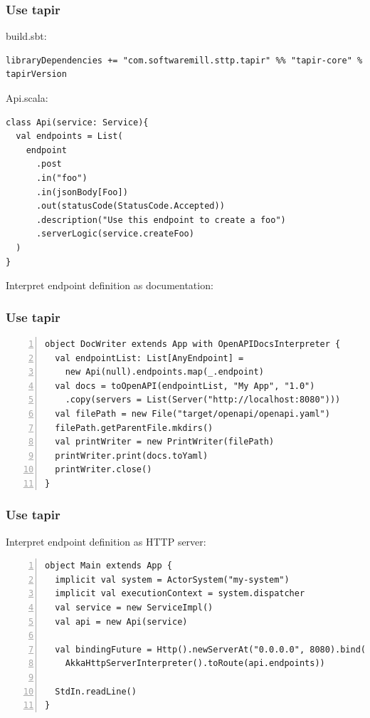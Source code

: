 \documentclass[aspectratio=169]{beamer}
\begin{document}
\begin{frame}[fragile]
  \frametitle{Use tapir}
build.sbt:
\begin{lstlisting}[style=myScalaStyle,frame=none]
libraryDependencies += "com.softwaremill.sttp.tapir" %% "tapir-core" % tapirVersion
\end{lstlisting}
\pause
Api.scala:
\begin{lstlisting}[style=myScalaStyle,frame=none]
class Api(service: Service){
  val endpoints = List(
    endpoint
      .post
      .in("foo")
      .in(jsonBody[Foo])
      .out(statusCode(StatusCode.Accepted))
      .description("Use this endpoint to create a foo")
      .serverLogic(service.createFoo)
  )
}

\end{lstlisting}

\end{frame}

\begin{frame}[fragile]
Interpret endpoint definition as documentation:

\frametitle{Use tapir}
\begin{lstlisting}[style=myScalaStyle,frame=none,numbers=left]
object DocWriter extends App with OpenAPIDocsInterpreter {
  val endpointList: List[AnyEndpoint] =
    new Api(null).endpoints.map(_.endpoint)
  val docs = toOpenAPI(endpointList, "My App", "1.0")
    .copy(servers = List(Server("http://localhost:8080")))
  val filePath = new File("target/openapi/openapi.yaml")
  filePath.getParentFile.mkdirs()
  val printWriter = new PrintWriter(filePath)
  printWriter.print(docs.toYaml)
  printWriter.close()
}

\end{lstlisting}


\end{frame}

\begin{frame}[fragile]

\frametitle{Use tapir}
Interpret endpoint definition as HTTP server:

\begin{lstlisting}[style=myScalaStyle,frame=none,numbers=left]
object Main extends App {
  implicit val system = ActorSystem("my-system")
  implicit val executionContext = system.dispatcher
  val service = new ServiceImpl()
  val api = new Api(service)

  val bindingFuture = Http().newServerAt("0.0.0.0", 8080).bind(
    AkkaHttpServerInterpreter().toRoute(api.endpoints))

  StdIn.readLine()
}
\end{lstlisting}
\end{frame}
\end{document}
